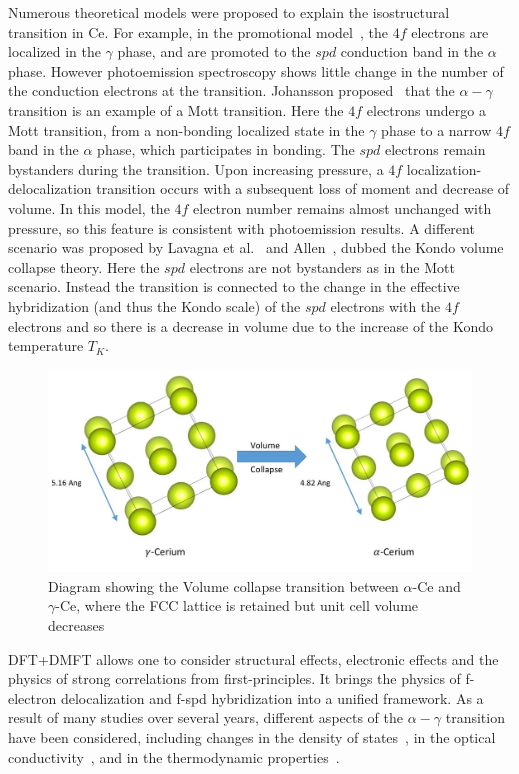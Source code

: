 \documentclass[10pt]{ruthesis}
\begin{document}
{Numerous theoretical models were proposed to explain the isostructural
transition in Ce. For example, in the promotional
model~\cite{promotional}, the $4f$ electrons are localized in the
$\gamma$ phase, and are promoted to the $spd$ conduction band in the
$\alpha$ phase.
%
However photoemission spectroscopy shows little change in the number
of the conduction electrons at the transition.
%
Johansson proposed~\cite{johansson} that the $\alpha-\gamma$
transition is an example of a Mott transition.  Here the $4f$
electrons undergo a Mott transition, from a non-bonding localized
state in the $\gamma$ phase to a narrow $4f$ band in the $\alpha$
phase, which participates in bonding.  The $spd$ electrons remain
bystanders during the transition.  Upon increasing pressure, a $4f$
localization-delocalization transition occurs with a subsequent loss
of moment and decrease of volume.  In this model, the $4f$ electron
number remains almost unchanged with pressure, so this feature is
consistent with photoemission results.  A different scenario was
proposed by Lavagna et al.~\cite{lavagna} and Allen~\cite{allenCe},
dubbed the Kondo volume collapse theory. Here the $spd$ electrons are
not bystanders as in the Mott scenario. Instead the transition is
connected to the change in the effective hybridization (and thus the
Kondo scale) of the $spd$ electrons with the $4f$ electrons and so
there is a decrease in volume due to the increase of the Kondo
temperature $T_K$.
\begin{figure}[H]
\includegraphics[width=\columnwidth]{Vol_collapse.jpg}
\caption{Diagram showing the Volume collapse transition between $\alpha$-Ce and $\gamma$-Ce, where the FCC lattice is retained but unit cell volume decreases \label{Vol_Collapse}}
\end{figure}


DFT+DMFT allows one to
consider  structural effects, electronic effects and the physics of strong
correlations from first-principles. It brings the physics of
f-electron delocalization and f-spd hybridization into a unified
framework.
%
As a result of many studies over several years, different
aspects of the $\alpha-\gamma$ transition have been considered,
including changes in the density of states~\cite{zolf2001, held2001,
  mcmahan2003}, in the optical conductivity~\cite{hauleCe}, and in the
thermodynamic properties~\cite{amadon}. 

}
\end{document}
